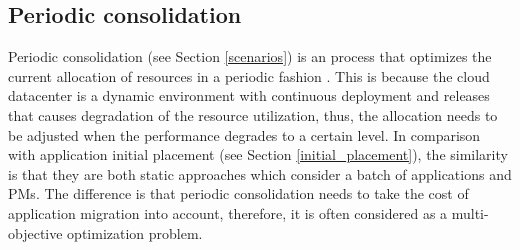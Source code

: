




\subsection{Periodic consolidation}
Periodic consolidation (see Section \ref{scenarios}) is an process that optimizes the current allocation of resources in a periodic fashion \cite{Mishra:2012kx}. This is because the cloud datacenter is a dynamic environment with continuous deployment and releases that causes degradation of the resource utilization, thus, the allocation needs to be adjusted when the performance degrades to a certain level. In comparison with application initial placement (see Section \ref{initial_placement}), the similarity is that they are both static approaches which consider a batch of applications and PMs. The difference is that periodic consolidation needs to take the cost of application migration into account, therefore, it is often considered as a multi-objective optimization problem. 

